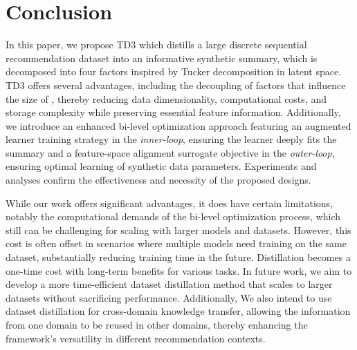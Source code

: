 \section{Conclusion}

In this paper, we propose TD3 which distills a large discrete sequential recommendation dataset into an informative synthetic summary, which is decomposed into four factors inspired by Tucker decomposition in latent space. TD3 offers several advantages, including the decoupling of factors that influence the size of \syn, thereby reducing data dimensionality, computational costs, and storage complexity while preserving essential feature information. Additionally, we introduce an enhanced bi-level optimization approach featuring an augmented learner training strategy in the \emph{inner-loop}, ensuring the learner deeply fits the summary and a feature-space alignment surrogate objective in the \emph{outer-loop}, ensuring optimal learning of synthetic data parameters. Experiments and analyses confirm the effectiveness and necessity of the proposed designs.

While our work offers significant advantages, it does have certain limitations, notably the computational demands of the bi-level optimization process, which still can be challenging for scaling with larger models and datasets. However, this cost is often offset in scenarios where multiple models need training on the same dataset, substantially reducing training time in the future. Distillation becomes a one-time cost with long-term benefits for various tasks. In future work, we aim to develop a more time-efficient dataset distillation method that scales to larger datasets without sacrificing performance. 
Additionally, We also intend to use dataset distillation for cross-domain knowledge transfer, allowing the information from one domain to be reused in other domains, thereby enhancing the framework's versatility in different recommendation contexts.

